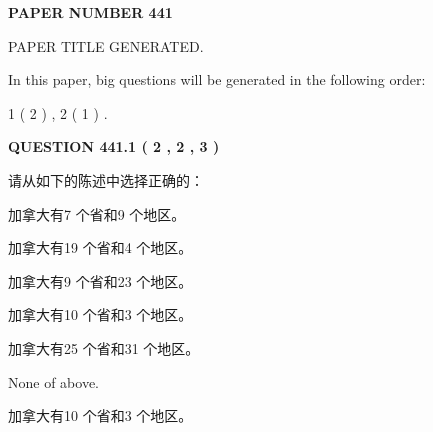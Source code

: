 \documentclass{ctexart}
\begin{document}
   
   
   
\newpage 
\setcounter{page}{ 
   441001 } 
   
   
   
   
 {\textbf{ \Large{ PAPER NUMBER  441  }}}
   
   
\vspace{0.2in}
   
   
   
   
   
   
   
   
 \vspace{0.2in}
 
 
 
 
   
   
 PAPER TITLE GENERATED.
   
   
   
\vspace{0.2in}
   
In this paper, big questions will be generated in the following order: 
   
   
   1 ( 2 )
 ,
   2 ( 1 )
 .
  
\vspace{0.2in}
  
{\textbf{\Large{QUESTION
441.1 
 ( 2 , 2 , 3 )
}}}
  
  
请从如下的陈述中选择正确的：
 
 
加拿大有7 个省和9 个地区。
 
 
加拿大有19 个省和4 个地区。
 
 
加拿大有9 个省和23 个地区。
 
 
加拿大有10 个省和3 个地区。
 
 
加拿大有25 个省和31 个地区。
 
 
 None of above.
 
 
\noindent{}
 
 
加拿大有10 个省和3 个地区。
 
 
\noindent{}
 
 
   
   
   
\end{document}
